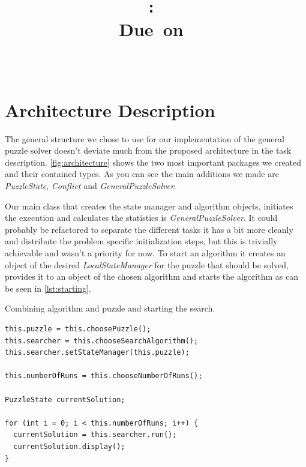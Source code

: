 \documentclass{scrartcl}
\title{
\vspace{2in}
\textmd{\textbf{\hmwkClass:\ \hmwkTitle}}\\
\normalsize\vspace{0.1in}\small{Due\ on\ \hmwkDueDate}\\
\vspace{0.1in}\large{\textit{\hmwkClassInstructor\ \hmwkClassTime}}
\vspace{3in}
}
\author{\textbf{\hmwkAuthorName}}
\date{} %
\begin{document}
\maketitle



\newpage
\tableofcontents
\newpage

\section{Architecture Description}

The general structure we chose to use for our implementation of the general puzzle solver doesn't deviate much from the proposed architecture in the task description. \autoref{fig:architecture} shows the two most important packages we created and their contained types. As you can see the main additions we made are \textit{PuzzleState}, \textit{Conflict} and \textit{GeneralPuzzleSolver}.

Our main class that creates the state manager and algorithm objects, initiates the execution and calculates the statistics is \textit{GeneralPuzzleSolver}. It could probably be refactored to separate the different tasks it has a bit more cleanly and distribute the problem specific initialization steps, but this is trivially achievable and wasn't a priority for now. To start an algorithm it creates an object of the desired \textit{LocalStateManager} for the puzzle that should be solved, provides it to an object of the chosen algorithm and starts the algorithm as can be seen in \autoref{lst:starting}.

\begin{listing}[H]
\caption{Combining algorithm and puzzle and starting the search.}
\label{lst:starting}
\begin{verbatim}
this.puzzle = this.choosePuzzle();
this.searcher = this.chooseSearchAlgorithm();
this.searcher.setStateManager(this.puzzle);
    
this.numberOfRuns = this.chooseNumberOfRuns();

PuzzleState currentSolution;

for (int i = 0; i < this.numberOfRuns; i++) {
  currentSolution = this.searcher.run();
  currentSolution.display();
}
\end{verbatim}
\end{listing}
\end{document}
